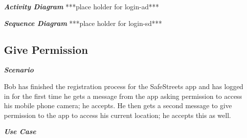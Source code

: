 \begin{table}[]
\begin{tabular}{ll}
\end{tabular}
\end{table}

\emph{\textbf{Activity Diagram}}
***place holder for login-ad***

\emph{\textbf{Sequence Diagram}}
***place holder for login-sd***

\subsection{Give Permission}

\emph{\textbf{Scenario}}

Bob has finished the registration process for the SafeStreets app and has logged in for the first time he gets a message from the app asking permission to access his mobile phone camera; he accepts. He then gets a second message to give permission to the app to access his current location; he accepts this as well.

\emph{\textbf{Use Case}}


